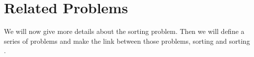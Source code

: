 \chapter{Related Problems}

We will now give more details about the sorting \XY problem. Then we will
define a series of problems and make the link between those problems,
sorting and sorting \XY.
